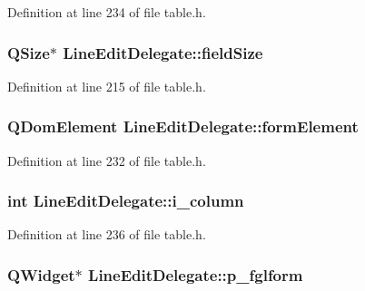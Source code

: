 Definition at line 234 of file table.h.

\hypertarget{classLineEditDelegate_ace648742ec01e245e35b39261383ae89}{
\subsubsection[{fieldSize}]{\setlength{\rightskip}{0pt plus 5cm}QSize$\ast$ {\bf LineEditDelegate::fieldSize}}}
\label{classLineEditDelegate_ace648742ec01e245e35b39261383ae89}


Definition at line 215 of file table.h.

\hypertarget{classLineEditDelegate_aa635e6dd4afb8971b6d85db420c16773}{
\subsubsection[{formElement}]{\setlength{\rightskip}{0pt plus 5cm}QDomElement {\bf LineEditDelegate::formElement}}}
\label{classLineEditDelegate_aa635e6dd4afb8971b6d85db420c16773}


Definition at line 232 of file table.h.

\hypertarget{classLineEditDelegate_a8484d34acb269d70d28e3ccaa98c8a49}{
\subsubsection[{i\_\-column}]{\setlength{\rightskip}{0pt plus 5cm}int {\bf LineEditDelegate::i\_\-column}}}
\label{classLineEditDelegate_a8484d34acb269d70d28e3ccaa98c8a49}


Definition at line 236 of file table.h.

\hypertarget{classLineEditDelegate_a2f504917f4de35dd8f400d8d696bdc1d}{
\subsubsection[{p\_\-fglform}]{\setlength{\rightskip}{0pt plus 5cm}QWidget$\ast$ {\bf LineEditDelegate::p\_\-fglform}}}
\label{classLineEditDelegate_a2f504917f4de35dd8f400d8d696bdc1d}


